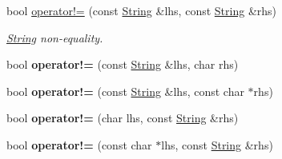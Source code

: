 {\bf }\par
\begin{DoxyCompactItemize}
\item 
bool \hyperlink{classString_ac4e429cee0b2f43d16eca3b016f5185c}{operator!=} (const \hyperlink{classString}{String} \&lhs, const \hyperlink{classString}{String} \&rhs)
\begin{DoxyCompactList}\small\item\em \hyperlink{classString}{String} non-\/equality. \end{DoxyCompactList}\item 
\hypertarget{classString_a7bc080b6ec496f3a94dbf8624902bc75}{bool {\bfseries operator!=} (const \hyperlink{classString}{String} \&lhs, char rhs)}\label{classString_a7bc080b6ec496f3a94dbf8624902bc75}

\item 
\hypertarget{classString_a1cadc42fadabb1c9aaa455d8f857a6db}{bool {\bfseries operator!=} (const \hyperlink{classString}{String} \&lhs, const char $\ast$rhs)}\label{classString_a1cadc42fadabb1c9aaa455d8f857a6db}

\item 
\hypertarget{classString_ace96b26f74fc799778c4246c841a6acf}{bool {\bfseries operator!=} (char lhs, const \hyperlink{classString}{String} \&rhs)}\label{classString_ace96b26f74fc799778c4246c841a6acf}

\item 
\hypertarget{classString_acab3e9f8bdf2c08f6cf2fc285558c1ce}{bool {\bfseries operator!=} (const char $\ast$lhs, const \hyperlink{classString}{String} \&rhs)}\label{classString_acab3e9f8bdf2c08f6cf2fc285558c1ce}

\end{DoxyCompactItemize}

